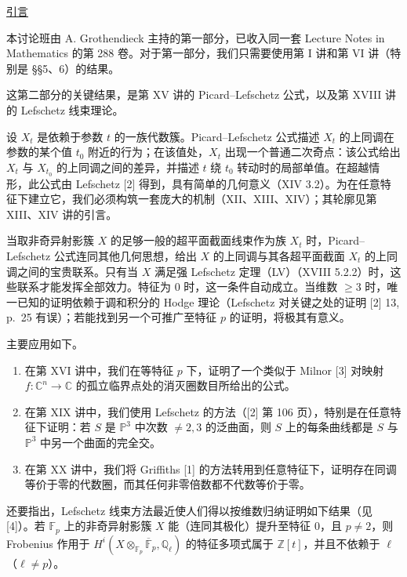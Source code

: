 \clearpage
\begin{center}
\underline{引言}
\end{center}
\medskip

本讨论班由 A. Grothendieck 主持的第一部分，已收入同一套 Lecture Notes in Mathematics 的第 288 卷。对于第一部分，我们只需要使用第 I 讲和第 VI 讲（特别是 \S\S5、6）的结果。

这第二部分的关键结果，是第 XV 讲的 Picard--Lefschetz 公式，以及第 XVIII 讲的 Lefschetz 线束理论。

设 $X_t$ 是依赖于参数 $t$ 的一族代数簇。Picard--Lefschetz 公式描述 $X_t$ 的上同调在参数的某个值 $t_0$ 附近的行为；在该值处，$X_t$ 出现一个普通二次奇点：该公式给出 $X_t$ 与 $X_{t_0}$ 的上同调之间的差异，并描述 $t$ 绕 $t_0$ 转动时的局部单值。在超越情形，此公式由 Lefschetz [2] 得到，具有简单的几何意义（XIV 3.2）。为在任意特征下建立它，我们必须构筑一套庞大的机制（XII、XIII、XIV）；其轮廓见第 XIII、XIV 讲的引言。

当取非奇异射影簇 $X$ 的足够一般的超平面截面线束作为族 $X_t$ 时，Picard--Lefschetz 公式连同其他几何思想，给出 $X$ 的上同调与其各超平面截面 $X_t$ 的上同调之间的宝贵联系。只有当 $X$ 满足强 Lefschetz 定理（LV）（XVIII 5.2.2）时，这些联系才能发挥全部效力。特征为 $0$ 时，这一条件自动成立。当维数 $\geq3$ 时，唯一已知的证明依赖于调和积分的 Hodge 理论（Lefschetz 对关键之处的证明 [2] 13, p.~25 有误）；若能找到另一个可推广至特征 $p$ 的证明，将极其有意义。

主要应用如下。

\begin{enumerate}[label=\alph*),leftmargin=2.6em]
\item 在第 XVI 讲中，我们在等特征 $p$ 下，证明了一个类似于 Milnor [3] 对映射 $f:\mathbb C^n\longrightarrow\mathbb C$ 的孤立临界点处的消灭圈数目所给出的公式。

\item 在第 XIX 讲中，我们使用 Lefschetz 的方法（[2] 第 106 页），特别是在任意特征下证明：若 $S$ 是 $\mathbb P^3$ 中次数 $\ne2,3$ 的泛曲面，则 $S$ 上的每条曲线都是 $S$ 与 $\mathbb P^3$ 中另一个曲面的完全交。

\item 在第 XX 讲中，我们将 Griffiths [1] 的方法转用到任意特征下，证明存在同调等价于零的代数圈，而其任何非零倍数都不代数等价于零。
\end{enumerate}

还要指出，Lefschetz 线束方法最近使人们得以按维数归纳证明如下结果（见 [4]）。若 $\mathbb F_p$ 上的非奇异射影簇 $X$ 能（连同其极化）提升至特征 $0$，且 $p\ne2$，则 Frobenius 作用于 $H^i(X\otimes_{\mathbb F_p}\overline{\mathbb F}_p,\mathbb Q_\ell)$ 的特征多项式属于 $\mathbb Z[t]$，并且不依赖于 $\ell$（$\ell\ne p$）。

